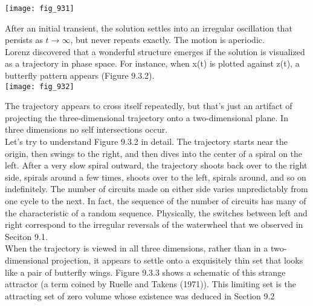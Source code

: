 \documentclass{article}
\newcommand\tab[1][1cm]{\hspace*{#1}}
\begin{document}
\texttt{[image: fig\_931]}

After an initial transient, the solution settles into an irregular oscillation that persists as $t \to \infty$, but never repeats exactly. The motion is aperiodic. \\ \tab
Lorenz discovered that a wonderful structure emerges if the solution is visualized as a trajectory in phase space. For instance, when x(t) is plotted against z(t), a butterfly pattern appears (Figure 9.3.2). \\

\texttt{[image: fig\_932]}

The trajectory appears to cross itself repeatedly, but that's just an artifact of projecting the three-dimensional trajectory onto a two-dimensional plane. In three dimensions no self intersections occur. \\ \tab
Let's try to understand Figure 9.3.2 in detail. The trajectory starts near the origin, then swings to the right, and then dives into the center of a spiral on the left. After a very slow spiral outward, the trajectory shoots back over to the right side, spirals around a few times, shoots over to the left, spirals around, and so on indefinitely. The number of circuits made on either side varies unpredictably from one cycle to the next. In fact, the sequence of the number of circuits has many of the characteristic of a random sequence. Physically, the switches between left and right correspond to the irregular reversals of the waterwheel that we observed in Seciton 9.1. \\ \tab
When the trajectory is viewed in all three dimensions, rather than in a two-dimensional projection, it appears to settle onto a exquisitely thin set that looks like a pair of butterfly wings. Figure 9.3.3 shows a schematic of this strange attractor (a term coined by Ruelle and Takens (1971)). This limiting set is the attracting set of zero volume whose existence was deduced in Section 9.2 \\
\end{document}
